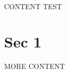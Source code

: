 \newcommand{\customDir}{../}







%



\maketitle
\newpage
\tableofcontents
\newpage

CONTENT
\HRule
TEST
\HDRule

\section{Sec 1}

\newpage

MORE CONTENT


